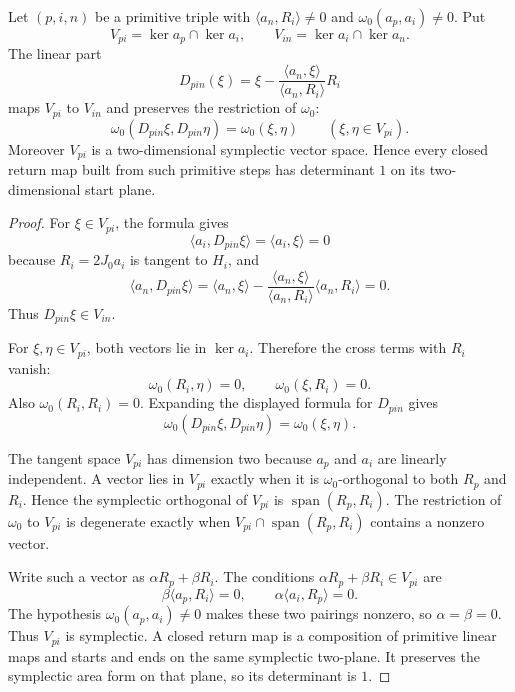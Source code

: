 \begin{unverified}
\begin{lemma}%
\label{lem:fg-primitive-linear-maps-symplectic}
Let \((p,i,n)\) be a primitive triple with
\(\langle a_n,R_i\rangle\ne0\) and \(\omega_0(a_p,a_i)\ne0\).  Put
\[
  V_{pi}=\ker a_p\cap\ker a_i,
  \qquad
  V_{in}=\ker a_i\cap\ker a_n .
\]
The linear part
\[
  D_{pin}(\xi)=
  \xi
  -
  \frac{\langle a_n,\xi\rangle}{\langle a_n,R_i\rangle}R_i
\]
maps \(V_{pi}\) to \(V_{in}\) and preserves the restriction of \(\omega_0\):
\[
  \omega_0(D_{pin}\xi,D_{pin}\eta)=\omega_0(\xi,\eta)
  \qquad(\xi,\eta\in V_{pi}).
\]
Moreover \(V_{pi}\) is a two-dimensional symplectic vector space.  Hence every
closed return map built from such primitive steps has determinant \(1\) on its
two-dimensional start plane.
\end{lemma}

\begin{proof}
For \(\xi\in V_{pi}\), the formula gives
\[
  \langle a_i,D_{pin}\xi\rangle=\langle a_i,\xi\rangle=0
\]
because \(R_i=2J_0a_i\) is tangent to \(H_i\), and
\[
  \langle a_n,D_{pin}\xi\rangle
  =
  \langle a_n,\xi\rangle
  -
  \frac{\langle a_n,\xi\rangle}{\langle a_n,R_i\rangle}
  \langle a_n,R_i\rangle
  =0.
\]
Thus \(D_{pin}\xi\in V_{in}\).

For \(\xi,\eta\in V_{pi}\), both vectors lie in \(\ker a_i\).  Therefore the
cross terms with \(R_i\) vanish:
\[
  \omega_0(R_i,\eta)=0,\qquad \omega_0(\xi,R_i)=0 .
\]
Also \(\omega_0(R_i,R_i)=0\).  Expanding the displayed formula for
\(D_{pin}\) gives
\[
  \omega_0(D_{pin}\xi,D_{pin}\eta)=\omega_0(\xi,\eta).
\]

The tangent space \(V_{pi}\) has dimension two because \(a_p\) and \(a_i\) are
linearly independent.  A vector lies in \(V_{pi}\) exactly when it is
\(\omega_0\)-orthogonal to both \(R_p\) and \(R_i\).  Hence the symplectic
orthogonal of \(V_{pi}\) is \(\operatorname{span}(R_p,R_i)\).  The
restriction of \(\omega_0\) to \(V_{pi}\) is degenerate exactly when
\(V_{pi}\cap\operatorname{span}(R_p,R_i)\) contains a nonzero vector.

Write such a vector as \(\alpha R_p+\beta R_i\).  The conditions
\(\alpha R_p+\beta R_i\in V_{pi}\) are
\[
  \beta\langle a_p,R_i\rangle=0,
  \qquad
  \alpha\langle a_i,R_p\rangle=0 .
\]
The hypothesis \(\omega_0(a_p,a_i)\ne0\) makes these two pairings nonzero, so
\(\alpha=\beta=0\).  Thus \(V_{pi}\) is symplectic.  A closed return map is a
composition of primitive linear maps and starts and ends on the same
symplectic two-plane.  It preserves the symplectic area form on that plane, so
its determinant is \(1\).
\end{proof}
\end{unverified}


